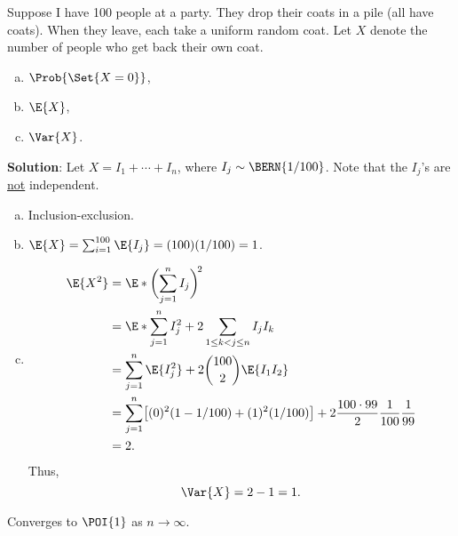 \begin{Example}{}{}
    Suppose I have 100 people at a party. They drop their coats in a pile (all have coats).
    When they leave, each take a uniform random coat.
    Let $ X $ denote the number of people who get back their own coat.
    \begin{enumerate}[(a)]
        \item $ \Prob{\Set{X=0}} $,
        \item $ \E{X} $,
        \item $ \Var{X} $.
    \end{enumerate}
    \tcblower{}
    \textbf{Solution}:
    Let $ X=I_1+\cdots+I_n $, where $ I_j\sim\BERN{1/100} $.
    Note that the $ I_j $'s are \underline{not} independent.
    \begin{enumerate}[(a)]
        \item Inclusion-exclusion.
        \item $ \E{X}=\sum_{i=1}^{100}\E{I_j}=(100)(1/100)=1 $.
        \item \begin{align*}
                  \E{X^2}
                   & =\E*{\biggl(\sum_{j=1}^{n}I_j\biggr)^{\!2}}                                                             \\
                   & =\E*{\sum_{j=1}^{n}I_j^2+2\sum_{1\le k<j\le n}I_j I_k}                                                  \\
                   & =\sum_{j=1}^{n}\E{I_j^2}+2\binom{100}{2}\E{I_1 I_2}                                                     \\
                   & =\sum_{j=1}^{n}\bigl[(0)^2(1-1/100)+(1)^2(1/100)\bigr]+2 \frac{100\cdot 99}{2}\frac{1}{100}\frac{1}{99} \\
                   & =2.
              \end{align*}
              Thus,
              \[ \Var{X}=2-1=1. \]
    \end{enumerate}
    Converges to $ \POI{1} $ as $ n\to\infty $.
\end{Example}
